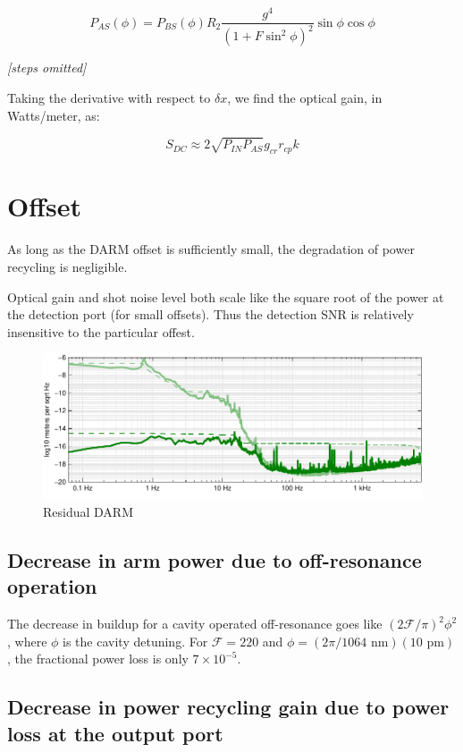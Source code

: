 \begin{equation}
P_{AS}(\phi)=P_{BS}(\phi)R_{2}\frac{g^{4}}{\left(1+F\sin^{2}\phi\right)^{2}}\sin\phi\cos\phi\end{equation}


\emph{{[}steps omitted{]}}

Taking the derivative with respect to $\delta x$, we find the optical
gain, in Watts/meter, as:

\begin{equation}
S_{DC}\approx2\sqrt{P_{IN}P_{AS}}g_{cr}r_{cp}k\label{eq:dc-readout-optical-gain}
\end{equation}

\section{Offset}

As long as the DARM offset is sufficiently small, the degradation of
power recycling is negligible.

Optical gain and shot noise level both scale like the square root of
the power at the detection port (for small offsets).  Thus the
detection SNR is relatively insensitive to the particular offest.

\begin{figure}
\centerline{\includegraphics[width=\columnwidth]{figures/residualDARM.pdf}}
\caption[Residual DARM motion]{\label{fig:residual-DARM}Residual DARM}
\end{figure}

\subsection{Decrease in arm power due to off-resonance operation}

The decrease in buildup for a cavity operated off-resonance goes like
$(2\mathcal{F}/\pi)^2\phi^2$, where $\phi$ is the cavity detuning.
For $\mathcal{F}=220$ and $\phi=(2\pi/1064\text{ nm})(10\text{ pm})$,
the fractional power loss is only $7\times10^{-5}$.

\subsection{Decrease in power recycling gain due to power loss at the output port}
